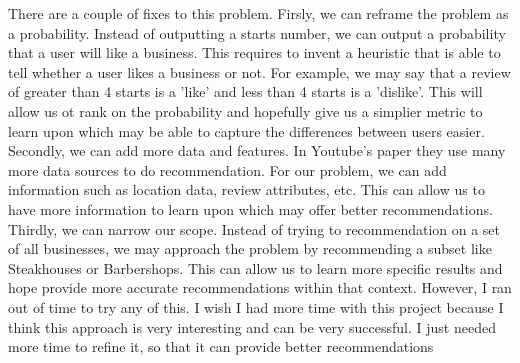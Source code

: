 \documentclass{article}
\begin{document}
There are a couple of fixes to this problem. Firsly, we can reframe the problem as a probability. Instead of outputting a starts number, we can output a probability that a user will like a business. This requires to invent a heuristic that is able to tell whether a user likes a business or not. For example, we may say that a review of greater than 4 starts is a 'like' and less than 4 starts is a 'dislike'. This will allow us ot rank on the probability and hopefully give us a simplier metric to learn upon which may be able to capture the differences between users easier. Secondly, we can add more data and features. In Youtube's paper they use many more data sources to do recommendation. For our problem, we can add information such as location data, review attributes, etc. This can allow us to have more information to learn upon which may offer better recommendations. Thirdly, we can narrow our scope. Instead of trying to recommendation on a set of all businesses, we may approach the problem by recommending a subset like Steakhouses or Barbershops. This can allow us to learn more specific results and hope provide more accurate recommendations within that context. However, I ran out of time to try any of this. I wish I had more time with this project because I think this approach is very interesting and can be very successful. I just needed more time to refine it, so that it can provide better recommendations

\medskip



\end{document}
